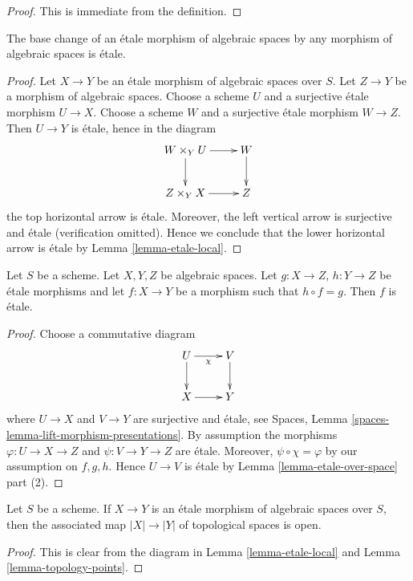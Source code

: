 \begin{proof}
This is immediate from the definition.
\end{proof}

\begin{lemma}
\label{lemma-base-change-etale}
The base change of an \'etale morphism of algebraic spaces
by any morphism of algebraic spaces is \'etale.
\end{lemma}

\begin{proof}
Let $X \to Y$ be an \'etale morphism of algebraic spaces over $S$.
Let $Z \to Y$ be a morphism of algebraic spaces.
Choose a scheme $U$ and a surjective \'etale morphism $U \to X$.
Choose a scheme $W$ and a surjective \'etale morphism $W \to Z$.
Then $U \to Y$ is \'etale, hence in the diagram
$$
\xymatrix{
W \times_Y U \ar[d] \ar[r] & W \ar[d] \\
Z \times_Y X \ar[r] & Z
}
$$
the top horizontal arrow is \'etale.
Moreover, the left vertical arrow is surjective
and \'etale (verification omitted). Hence we conclude that the lower
horizontal arrow is \'etale by Lemma \ref{lemma-etale-local}.
\end{proof}

\begin{lemma}
\label{lemma-etale-permanence}
Let $S$ be a scheme. Let $X, Y, Z$ be algebraic spaces.
Let $g : X \to Z$, $h : Y \to Z$ be \'etale morphisms and let
$f : X \to Y$ be a morphism such that $h \circ f = g$.
Then $f$ is \'etale.
\end{lemma}

\begin{proof}
Choose a commutative diagram
$$
\xymatrix{
U \ar[d] \ar[r]_\chi & V \ar[d] \\
X \ar[r] & Y
}
$$
where $U \to X$ and $V \to Y$ are surjective and \'etale, see
Spaces, Lemma \ref{spaces-lemma-lift-morphism-presentations}.
By assumption the morphisms $\varphi : U \to X \to Z$ and
$\psi : V \to Y \to Z$ are \'etale. Moreover, $\psi \circ \chi = \varphi$
by our assumption on $f, g, h$.
Hence $U \to V$ is \'etale by Lemma \ref{lemma-etale-over-space}
part (2).
\end{proof}

\begin{lemma}
\label{lemma-etale-open}
Let $S$ be a scheme.
If $X \to Y$ is an \'etale morphism of algebraic spaces over $S$,
then the associated map $|X| \to |Y|$ of topological spaces
is open.
\end{lemma}

\begin{proof}
This is clear from the diagram in
Lemma \ref{lemma-etale-local} and Lemma \ref{lemma-topology-points}.
\end{proof}

